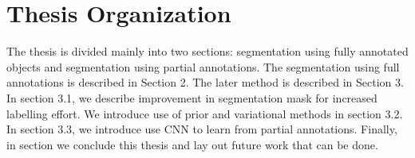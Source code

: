 \section{Thesis Organization}
The thesis is divided mainly into two sections: segmentation using fully annotated objects and segmentation using partial annotations. The segmentation using full annotations is described in Section 2. The later method is described in Section 3. In section 3.1, we describe improvement in segmentation mask for increased labelling effort. We introduce use of prior and variational methods in section 3.2. In section 3.3, we introduce use CNN to learn from partial annotations. Finally, in section we conclude this thesis and lay out future work that can be done.



